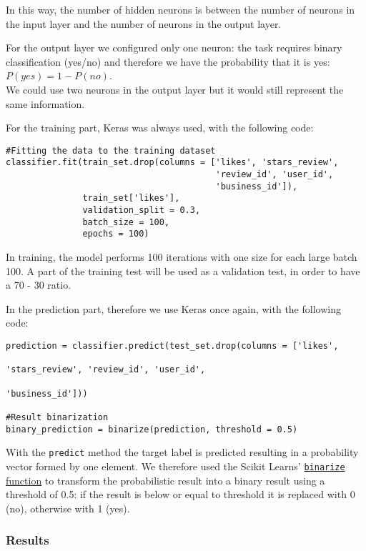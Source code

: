 In this way, the number of hidden neurons is between the number of neurons in the input layer and the number of neurons in the output layer.

For the output layer we configured only one neuron: the task requires binary classification (yes/no) and therefore we have the probability that it is yes: $P(yes) = 1 - P(no)$.\\
We could use two neurons in the output layer but it would still represent the same information.

For the training part, Keras was always used, with the following code:

\begin{lstlisting}[caption={Neural Network training},label={lst:nn-fit}]
#Fitting the data to the training dataset
classifier.fit(train_set.drop(columns = ['likes', 'stars_review', 
                                         'review_id', 'user_id', 
                                         'business_id']), 
               train_set['likes'], 
               validation_split = 0.3, 
               batch_size = 100, 
               epochs = 100)
\end{lstlisting}

In training, the model performs 100 iterations with one size for each large batch 100. A part of the training test will be used as a validation test, in order to have a 70 - 30 ratio.

In the prediction part, therefore we use Keras once again, with the following code:

\begin{lstlisting}[caption={Neural Network predictions},label={lst:nn-pred}]
prediction = classifier.predict(test_set.drop(columns = ['likes', 
                                                         'stars_review', 'review_id', 'user_id', 
                                                         'business_id']))

#Result binarization
binary_prediction = binarize(prediction, threshold = 0.5)
\end{lstlisting}

With the \texttt{predict} method the target label is predicted resulting in a probability vector formed by one element. We therefore used the Scikit Learns' \href{https://scikit-learn.org/stable/modules/generated/sklearn.preprocessing.binarize.html}{\texttt{binarize} function} to transform the probabilistic result into a binary result using a threshold of 0.5: if the result is below or equal to threshold it is replaced with 0 (no), otherwise with 1 (yes).


\subsubsection{Results}

